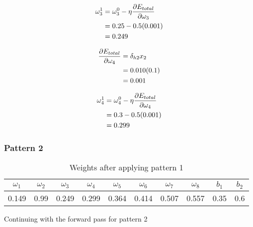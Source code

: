 \documentclass[10pt,a4paper]{article}
\begin{document}
\begin{equation}
\begin{split}
\omega_3^1 &= \omega_3^0 - \eta\pdv{E_{total}}{\omega_3}\\
           &= 0.25 -0.5(0.001)\\
           &= 0.249\\
\end{split}
\end{equation}

\begin{equation}
\begin{split}
\pdv{E_{total}}{\omega_4} &= \delta_{h2}x_2\\ 
                          &= 0.010(0.1)\\
                          &= 0.001\\
\end{split}
\end{equation}

\begin{equation}
\begin{split}
\omega_4^1 &= \omega_4^0 - \eta\pdv{E_{total}}{\omega_4}\\
           &= 0.3 -0.5(0.001)\\
           &= 0.299\\
\end{split}
\end{equation}

\subsubsection{Pattern 2}
\begin{table}
\begin{tabular}{|c|c|c|c|c|c|c|c|c|c|}
\hline
$\omega_1$ & $\omega_2$ & $\omega_3$ & $\omega_4$ & $\omega_5$ & $\omega_6$ & $\omega_7$ & $\omega_8$ & $b_1$ & $b_2$\\
\hline
0.149 &0.99 &0.249 & 0.299 & 0.364 & 0.414 & 0.507 & 0.557 & 0.35 & 0.6 \\
\hline
\end{tabular}
\caption{Weights after applying pattern 1}\label{tablep2}
\end{table}

Continuing with the forward pass for pattern 2
\end{document}
